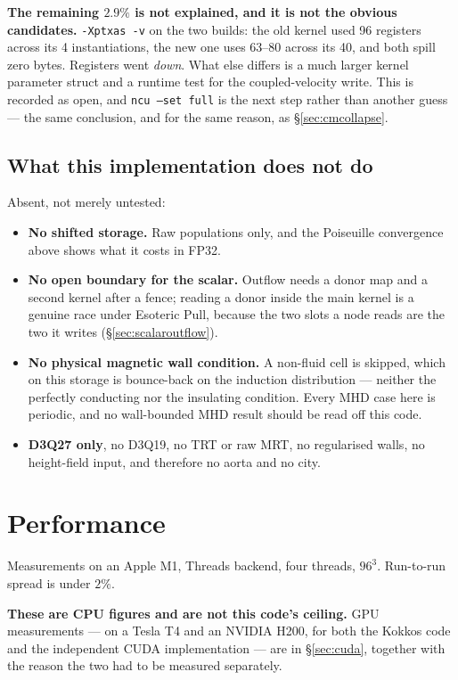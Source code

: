 \documentclass[11pt,a4paper]{article}
\newcommand{\code}[1]{\texttt{\small #1}}
\begin{document}
\textbf{The remaining $2.9\%$ is not explained, and it is not the obvious
candidates.} \code{-Xptxas -v} on the two builds: the old kernel used 96
registers across its 4 instantiations, the new one uses 63--80 across its 40, and
both spill zero bytes. Registers went \emph{down}. What else differs is a much
larger kernel parameter struct and a runtime test for the coupled-velocity write.
This is recorded as open, and \code{ncu --set full} is the next step rather than
another guess --- the same conclusion, and for the same reason, as
\S\ref{sec:cmcollapse}.

\subsection{What this implementation does not do}

Absent, not merely untested:

\begin{itemize}[leftmargin=1.4em,itemsep=3pt]
\item \textbf{No shifted storage.} Raw populations only, and the Poiseuille
  convergence above shows what it costs in FP32.
\item \textbf{No open boundary for the scalar.} Outflow needs a donor map and a
  second kernel after a fence; reading a donor inside the main kernel is a genuine
  race under Esoteric Pull, because the two slots a node reads are the two it
  writes (\S\ref{sec:scalaroutflow}).
\item \textbf{No physical magnetic wall condition.} A non-fluid cell is skipped,
  which on this storage is bounce-back on the induction distribution --- neither
  the perfectly conducting nor the insulating condition. Every MHD case here is
  periodic, and no wall-bounded MHD result should be read off this code.
\item \textbf{D3Q27 only}, no D3Q19, no TRT or raw MRT, no regularised walls, no
  height-field input, and therefore no aorta and no city.
\end{itemize}

\section{Performance}
\label{sec:perf}

Measurements on an Apple M1, Threads backend, four threads, $96^3$. Run-to-run
spread is under $2\%$.

\textbf{These are CPU figures and are not this code's ceiling.} GPU
measurements --- on a Tesla T4 and an NVIDIA H200, for both the Kokkos code and
the independent CUDA implementation --- are in \S\ref{sec:cuda}, together with
the reason the two had to be measured separately.
\end{document}
